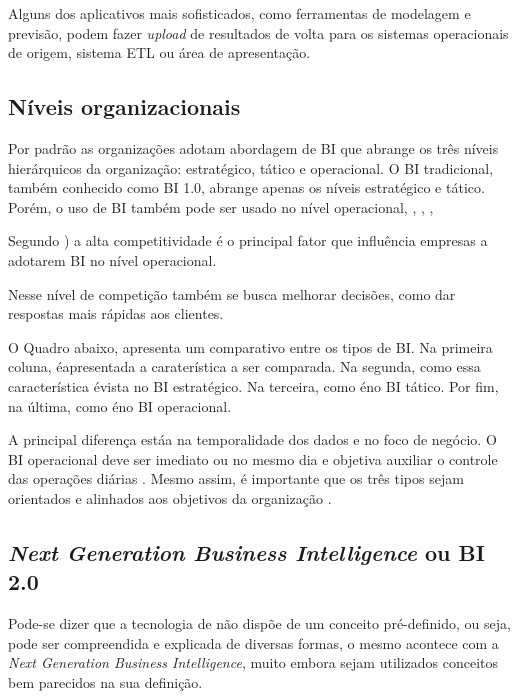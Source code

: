 Alguns dos aplicativos mais sofisticados, como ferramentas de modelagem e previs\~{a}o, podem fazer \textit{upload} de resultados de volta para os sistemas operacionais de origem, sistema ETL ou \'{a}rea de apresenta\c{c}\~{a}o.

\subsection{N\'{i}veis organizacionais}

Por padr\~{a}o as organiza\c{c}\~{o}es adotam abordagem de BI que abrange os tr\^{e}s n\'{i}veis hier\'{a}rquicos da organiza\c{c}\~{a}o: estrat\'{e}gico, t\'{a}tico e operacional. O BI tradicional, tamb\'{e}m conhecido como BI 1.0, abrange apenas os n\'{i}veis estrat\'{e}gico e  t\'{a}tico. Por\'{e}m, o uso de BI tamb\'{e}m pode ser usado no n\'{i}vel operacional, \cite{bi-imhoff-2006}, \cite{bi-airinei-2009}, \cite{bi-baltzan-2012}, \cite{bi-turban-2013}

Segundo \cite{bi-turban-2013}) a alta competitividade \'{e} o principal fator que influ\^{e}ncia empresas a adotarem BI no n\'{i}vel operacional.

Nesse n\'{i}vel de competi\c{c}\~{a}o tamb\'{e}m se busca melhorar decis\~{o}es, como dar respostas mais r\'{a}pidas aos clientes. 

O Quadro abaixo, apresenta um comparativo entre os tipos de BI. Na primeira coluna, \'{e}apresentada a carater\'{i}stica a ser comparada. Na segunda, como essa caracter\'{i}stica \'{e}vista no BI estrat\'{e}gico. Na terceira, como \'{e}no BI t\'{a}tico. Por fim, na última, como \'{e}no BI operacional.

A principal diferen\c{c}a est\'a{a} na temporalidade dos dados e no foco de neg\'{o}cio. O BI operacional deve ser imediato ou no mesmo dia e objetiva auxiliar o controle das opera\c{c}\~{o}es di\'{a}rias \cite{bi-turban-2013}. Mesmo  assim, \'{e} importante que os três tipos sejam orientados e alinhados aos objetivos da organiza\c{c}\~{a}o \cite{bi-baltzan-2012}.



\subsection{\textit{Next Generation Business Intelligence} ou BI 2.0}

Pode-se dizer que a tecnologia de  n\~{a}o disp\~{o}e de um conceito pr\'{e}-definido, ou seja, pode ser compreendida e explicada de diversas formas, o mesmo acontece com a \textit{Next Generation Business Intelligence}, muito embora sejam utilizados conceitos bem parecidos na sua defini\c{c}\~{a}o. 

